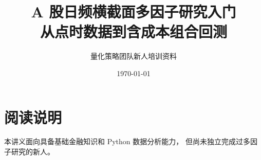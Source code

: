 \documentclass[11pt,a4paper,oneside,openany]{ctexbook}
\title{
  \textbf{A 股日频横截面多因子研究入门}\\[0.6em]
  \large 从点时数据到含成本组合回测
}
\author{量化策略团队新人培训资料}
\date{\today}
\begin{document}
\frontmatter

\maketitle
\tableofcontents

\chapter*{阅读说明}

本讲义面向具备基础金融知识和 Python 数据分析能力，
但尚未独立完成过多因子研究的新人。

\mainmatter












\appendix






\end{document}
